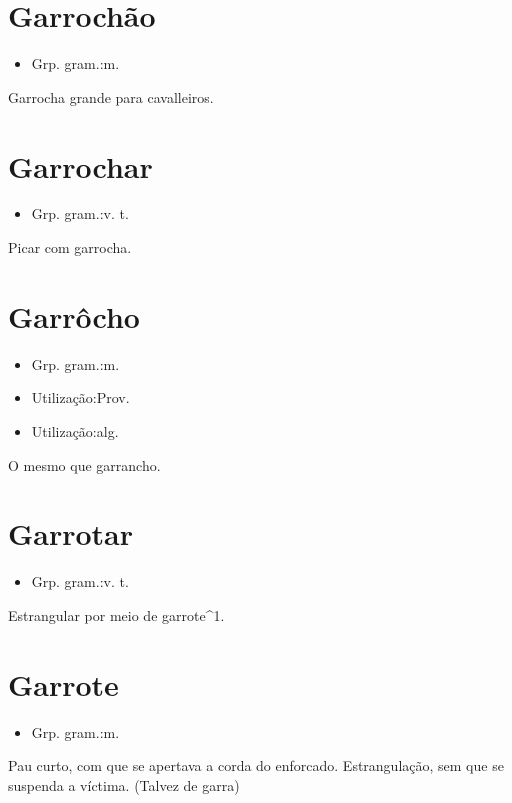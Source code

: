 \section{Garrochão}
\begin{itemize}
\item {Grp. gram.:m.}
\end{itemize}
Garrocha grande para cavalleiros.
\section{Garrochar}
\begin{itemize}
\item {Grp. gram.:v. t.}
\end{itemize}
Picar com garrocha.
\section{Garrôcho}
\begin{itemize}
\item {Grp. gram.:m.}
\end{itemize}
\begin{itemize}
\item {Utilização:Prov.}
\end{itemize}
\begin{itemize}
\item {Utilização:alg.}
\end{itemize}
O mesmo que \textunderscore garrancho\textunderscore .
\section{Garrotar}
\begin{itemize}
\item {Grp. gram.:v. t.}
\end{itemize}
Estrangular por meio de garrote^1.
\section{Garrote}
\begin{itemize}
\item {Grp. gram.:m.}
\end{itemize}
Pau curto, com que se apertava a corda do enforcado.
Estrangulação, sem que se suspenda a víctima.
(Talvez de \textunderscore garra\textunderscore )
